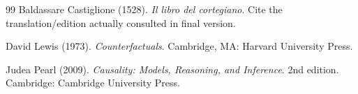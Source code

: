 \documentclass[11pt]{article}
\begin{document}
\begin{thebibliography}{99}
Baldassare Castiglione (1528). \emph{Il libro del cortegiano}. Cite the translation/edition actually consulted in final version.

David Lewis (1973). \emph{Counterfactuals}. Cambridge, MA: Harvard University Press.

Judea Pearl (2009). \emph{Causality: Models, Reasoning, and Inference}. 2nd edition. Cambridge: Cambridge University Press.

\end{thebibliography}
\end{document}
